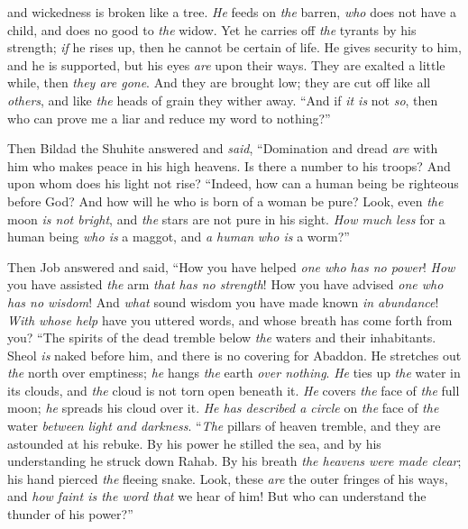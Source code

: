 \begin{biblechapter}
and wickedness is broken like a tree.
\verse \textit{He} feeds on \textit{the} barren, \textit{who} does not have a child, 
and does no good to \textit{the} widow.
\verse Yet he carries off \textit{the} tyrants by his strength; 
\textit{if} he rises up, then he cannot be certain of life.
\verse He gives security to him, and he is supported, 
but his eyes \textit{are} upon their ways.
\verse They are exalted a little while, then \textit{they are gone}. 
And they are brought low; they are cut off like all \textit{others}, 
and like \textit{the} heads of grain they wither away.
\verse “And if \textit{it is} not \textit{so}, then who can prove me a liar 
and reduce my word to nothing?”
\end{biblechapter}

\begin{biblechapter} %
 Then Bildad the Shuhite answered and \textit{said},
\verse “Domination and dread \textit{are} with him 
who makes peace in his high heavens.
\verse Is there a number to his troops? 
And upon whom does his light not rise?
\verse “Indeed, how can a human being be righteous before God? 
And how will he who is born of a woman be pure?
\verse Look, even \textit{the} moon \textit{is not bright}, 
and \textit{the} stars are not pure in his sight.
\verse \textit{How much less} for a human being \textit{who is} a maggot, 
and \textit{a human} \textit{who is} a worm?”
\end{biblechapter}

\begin{biblechapter} %
 Then Job answered and said,
\verse “How you have helped \textit{one who has no power}! 
\textit{How} you have assisted \textit{the} arm \textit{that has no strength}!
\verse How you have advised \textit{one who has no wisdom}! 
And \textit{what} sound wisdom you have made known \textit{in abundance}!
\verse \textit{With whose help} have you uttered words, 
and whose breath has come forth from you?
\verse “The spirits of the dead tremble 
below \textit{the} waters and their inhabitants.
\verse Sheol \textit{is} naked before him, 
and there is no covering for Abaddon.
\verse He stretches out \textit{the} north over emptiness; 
\textit{he} hangs \textit{the} earth \textit{over nothing}.
\verse \textit{He} ties up \textit{the} water in its clouds, 
and \textit{the} cloud is not torn open beneath it.
\verse \textit{He} covers \textit{the} face of \textit{the} full moon; 
\textit{he} spreads his cloud over it.
\verse \textit{He has described a circle} on \textit{the} face of \textit{the} water 
\textit{between light and darkness}.
\verse “\textit{The} pillars of heaven tremble, 
and they are astounded at his rebuke.
\verse By his power he stilled the sea, 
and by his understanding he struck down Rahab.
\verse By his breath \textit{the heavens were made clear}; 
his hand pierced \textit{the} fleeing snake.
\verse Look, these \textit{are} the outer fringes of his ways, 
and \textit{how faint is the word} \textit{that} we hear of him! 
But who can understand the thunder of his power?”
\end{biblechapter}

